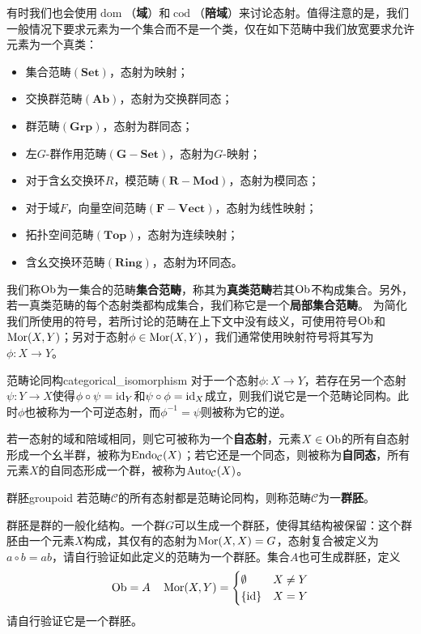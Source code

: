 \documentclass[../main.tex]{subfiles}
\begin{document}
有时我们也会使用$\operatorname{dom}$（\textbf{域}）和$\operatorname{cod}$（\textbf{陪域}）来讨论态射。值得注意的是，我们一般情况下要求元素为一个集合而不是一个类，仅在如下范畴中我们放宽要求允许元素为一个真类：
\begin{itemize}
    \item 集合范畴$(\mathbf{Set})$，态射为映射；
    \item 交换群范畴$(\mathbf{Ab})$，态射为交换群同态；
    \item 群范畴$(\mathbf{Grp})$，态射为群同态；
    \item 左$G$-群作用范畴$(\mathbf{G{-}Set})$，态射为$G$-映射；
    \item 对于含幺交换环$R$，模范畴$(\mathbf{R{-}Mod})$，态射为模同态；
    \item 对于域$F$，向量空间范畴$(\mathbf{F{-}Vect})$，态射为线性映射；
    \item 拓扑空间范畴$(\mathbf{Top})$，态射为连续映射；
    \item 含幺交换环范畴$(\mathbf{Ring})$，态射为环同态。
\end{itemize}
我们称$\operatorname{Ob}$为一集合的范畴\textbf{集合范畴}，称其为\textbf{真类范畴}若其$\operatorname{Ob}$不构成集合。另外，若一真类范畴的每个态射类都构成集合，我们称它是一个\textbf{局部集合范畴}。
为简化我们所使用的符号，若所讨论的范畴在上下文中没有歧义，可使用符号$\operatorname{Ob}$和$\operatorname{Mor}(X,Y)$；另对于态射$\phi\in\operatorname{Mor}(X,Y)$，我们通常使用映射符号将其写为$\phi:X\to Y$。

\begin{definition}{范畴论同构}{categorical_isomorphism}
对于一个态射$\phi:X\to Y$，若存在另一个态射$\psi:Y\to X$使得$\phi\circ\psi=\operatorname{id}_Y$和$\psi\circ\phi=\operatorname{id}_X$成立，则我们说它是一个范畴论同构。此时$\phi$也被称为一个可逆态射，而$\phi^{-1}=\psi$则被称为它的逆。
\end{definition}
若一态射的域和陪域相同，则它可被称为一个\textbf{自态射}，元素$X\in\operatorname{Ob}$的所有自态射形成一个幺半群，被称为$\operatorname{Endo}_\mathcal{C}(X)$；若它还是一个同态，则被称为\textbf{自同态}，所有元素$X$的自同态形成一个群，被称为$\operatorname{Auto}_\mathcal{C}(X)$。

\begin{definition}{群胚}{groupoid}
若范畴$\mathcal{C}$的所有态射都是范畴论同构，则称范畴$\mathcal{C}$为一\textbf{群胚}。
\end{definition}
群胚是群的一般化结构。一个群$G$可以生成一个群胚，使得其结构被保留：这个群胚由一个元素$X$构成，其仅有的态射为$\operatorname{Mor}(X,X)=G$，态射复合被定义为$a\circ b=ab$，请自行验证如此定义的范畴为一个群胚。集合$A$也可生成群胚，定义$$\operatorname{Ob}=A\quad\operatorname{Mor}(X,Y)=\begin{cases}\emptyset&X\neq Y\\\{\operatorname{id}\}&X=Y\end{cases}$$请自行验证它是一个群胚。
\end{document}

